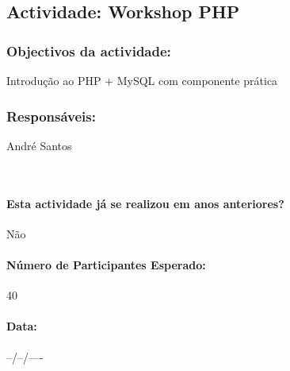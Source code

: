 \subsection{Actividade: Workshop PHP} %

\subsubsection*{Objectivos da actividade:}
Introdução ao PHP + MySQL com componente prática
~
\subsubsection*{Responsáveis:}
\begin{itemizedash}
	\item André Santos
\end{itemizedash}
~
\paragraph{Esta actividade já se realizou em anos anteriores?}
Não

\paragraph{Número de Participantes Esperado:}
40

\paragraph{Data:} --/--/----

\vspace{20pt}

